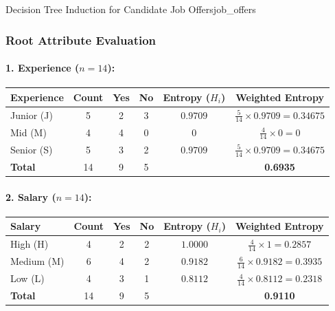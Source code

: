 \begin{example}{Decision Tree Induction for Candidate Job Offers}{job_offers}
\subsubsection{Root Attribute Evaluation}

\paragraph{1. Experience ($n = 14$):}
\begin{center}\renewcommand{\arraystretch}{1.35}
\begin{tabular}{lccccc}
\toprule
\textbf{Experience} & \textbf{Count} & \textbf{Yes} & \textbf{No} & \textbf{Entropy ($H_i$)} & \textbf{Weighted Entropy} \\
\midrule
Junior (J) & 5 & 2 & 3 & $0.9709$ & $\frac{5}{14} \times 0.9709 = 0.34675$ \\
Mid (M)    & 4 & 4 & 0 & $0$      & $\frac{4}{14} \times 0 = 0$ \\
Senior (S) & 5 & 3 & 2 & $0.9709$ & $\frac{5}{14} \times 0.9709 = 0.34675$ \\
\midrule
\textbf{Total} & 14 & 9 & 5 & & \textbf{0.6935} \\
\bottomrule
\end{tabular}
\end{center}

\paragraph{2. Salary ($n = 14$):}
\begin{center}\renewcommand{\arraystretch}{1.35}
\begin{tabular}{lccccc}
\toprule
\textbf{Salary} & \textbf{Count} & \textbf{Yes} & \textbf{No} & \textbf{Entropy ($H_i$)} & \textbf{Weighted Entropy} \\
\midrule
High (H)   & 4 & 2 & 2 & $1.0000$ & $\frac{4}{14} \times 1 = 0.2857$ \\
Medium (M) & 6 & 4 & 2 & $0.9182$ & $\frac{6}{14} \times 0.9182 = 0.3935$ \\
Low (L)    & 4 & 3 & 1 & $0.8112$ & $\frac{4}{14} \times 0.8112 = 0.2318$ \\
\midrule
\textbf{Total} & 14 & 9 & 5 & & \textbf{0.9110} \\
\bottomrule
\end{tabular}
\end{center}


\end{example}
